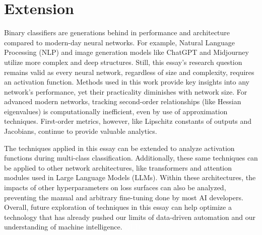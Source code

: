 \documentclass{article}
\theoremstyle{definition}
\begin{document}
\section{Extension}
Binary classifiers are generations behind in performance and architecture compared to modern-day neural networks. For example, Natural Language Processing (NLP) and image generation models like ChatGPT and Midjourney utilize more complex and deep structures. Still, this essay's research question remains valid as every neural network, regardless of size and complexity, requires an activation function. Methods used in this work provide key insights into any network's performance, yet their practicality diminishes with network size. For advanced modern networks, tracking second-order relationships (like Hessian eigenvalues) is computationally inefficient, even by use of approximation techniques. First-order metrics, however, like Lipschitz constants of outputs and Jacobians, continue to provide valuable analytics.

The techniques applied in this essay can be extended to analyze activation functions during multi-class classification. Additionally, these same techniques can be applied to other network architectures, like transformers and attention modules used in Large Language Models (LLMs). Within these architectures, the impacts of other hyperparameters on loss surfaces can also be analyzed, preventing the manual and arbitrary fine-tuning done by most AI developers. Overall, future exploration of techniques in this essay can help optimize a technology that has already pushed our limits of data-driven automation and our understanding of machine intelligence.
\textcolor{white}{QED.}
\printbibliography
\end{document}
